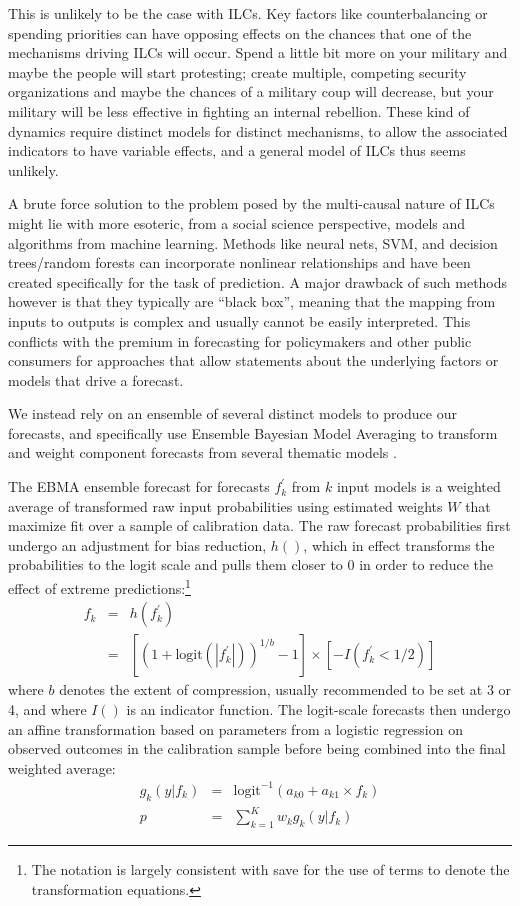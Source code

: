 \documentclass[pdftex,11pt]{article}
\begin{document}
This is unlikely to be the case with ILCs.
Key factors like counterbalancing or spending priorities can have opposing effects on the chances that one of the mechanisms driving ILCs will occur. Spend a little bit more on your military and maybe the people will start protesting; create multiple, competing security organizations and maybe the chances of a military coup will decrease, but your military will be less effective in fighting an internal rebellion. These kind of dynamics require distinct models for distinct mechanisms, to allow the associated indicators to have variable effects, and a general model of ILCs thus seems unlikely. 

A brute force solution to the problem posed by the multi-causal nature of ILCs might lie with more esoteric, from a social science perspective, models and algorithms from machine learning. Methods like neural nets, SVM, and decision trees/random forests can incorporate nonlinear relationships and have been created specifically for the task of prediction. A major drawback of such methods however is that they typically are ``black box'', meaning that the mapping from inputs to outputs is complex and usually cannot be easily interpreted. This conflicts with the premium in forecasting for policymakers and other public consumers for approaches that allow statements about the underlying factors or models that drive a forecast.

We instead rely on an ensemble of several distinct models to produce our forecasts, and specifically use Ensemble Bayesian Model Averaging to transform and weight component forecasts from several thematic models \citep{Raftery:2005, montgomery:etal:2012}.

The EBMA ensemble forecast for forecasts $f_k^\prime$ from $k$ input models is a weighted average of transformed raw input probabilities using estimated weights $W$ that maximize fit over a sample of calibration data. The raw forecast probabilities first undergo an adjustment for bias reduction, $h()$, which in effect transforms the probabilities to the logit scale and pulls them closer to 0 in order to reduce the effect of extreme predictions:\footnote{The notation is largely consistent with \citep{montgomery:etal:2012} save for the use of terms to denote the transformation equations.}
\begin{eqnarray}
f_k &=& h(f_k^\prime) \\
      &=& [ ( 1 + \textrm{logit}(|f^\prime_k|))^{1/b} - 1 ] \times [ - I(f^\prime_k < 1/2) ]
\end{eqnarray}
where $b$ denotes the extent of compression, usually recommended to be set at 3 or 4, and where $I()$ is an indicator function. The logit-scale forecasts then undergo an affine transformation based on parameters from a logistic regression on observed outcomes in the calibration sample before being combined into the final weighted average:
\begin{eqnarray}
g_k(y|f_k) &=& \textrm{logit}^{-1} ( a_{k0} + a_{k1} \times f_k ) \\
p &=& \sum_{k=1}^K w_k g_k(y|f_k)
\end{eqnarray}
\end{document}
